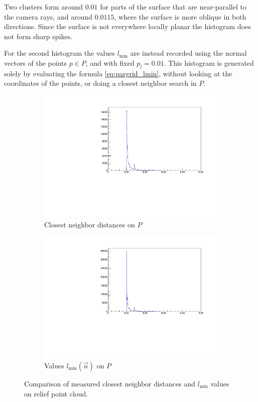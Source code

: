 Two clusters form around $0.01$ for parts of the surface that are near-parallel to the camera rays, and around $0.0115$, where the surface is more oblique in both directions. Since the surface is not everywhere locally planar the histogram does not form sharp spikes.

For the second histogram the values $l_{\text{min}}$ are instead recorded using the normal vectors of the points $p \in P$, and with fixed $p_l = 0.01$. This histogram is generated solely by evaluating the formula \ref{eq:pargrid_lmin}, without looking at the coordinates of the points, or doing a closest neighbor search in $P$.

\begin{figure}[H]
\centering
\begin{subfigure}{.5\textwidth}
	\includegraphics[width=\linewidth]{fig/nn.pdf}
	\caption{Closest neighbor distances on $P$}
\end{subfigure}%
\begin{subfigure}{.5\textwidth}
	\includegraphics[width=\linewidth]{fig/nn_lmin.pdf}
	\caption{Values $l_{\text{min}}(\vec{n})$ on $P$}
\end{subfigure}	
\caption{Comparison of measured closest neighbor distances and $l_\text{min}$ values on relief point cloud.}
\label{fig:relief_nn_hist}
\end{figure}

